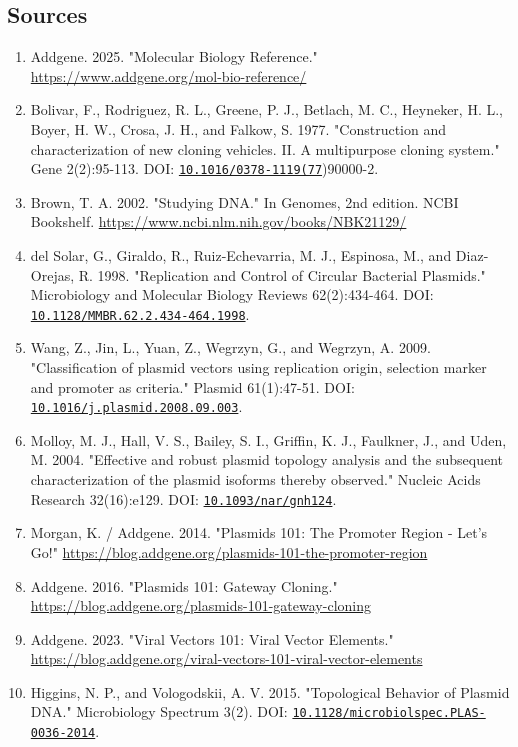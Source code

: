 \documentclass[11pt]{report}
\begin{document}
\subsection{Sources}
\begin{enumerate}
\item Addgene. 2025. "Molecular Biology Reference." \url{https://www.addgene.org/mol-bio-reference/}
\item Bolivar, F., Rodriguez, R. L., Greene, P. J., Betlach, M. C., Heyneker, H. L., Boyer, H. W., Crosa, J. H., and Falkow, S. 1977. "Construction and characterization of new cloning vehicles. II. A multipurpose cloning system." Gene 2(2):95-113. DOI: \href{https://doi.org/10.1016/0378-1119(77}{\nolinkurl{10.1016/0378-1119(77}})90000-2.
\item Brown, T. A. 2002. "Studying DNA." In Genomes, 2nd edition. NCBI Bookshelf. \url{https://www.ncbi.nlm.nih.gov/books/NBK21129/}
\item del Solar, G., Giraldo, R., Ruiz-Echevarria, M. J., Espinosa, M., and Diaz-Orejas, R. 1998. "Replication and Control of Circular Bacterial Plasmids." Microbiology and Molecular Biology Reviews 62(2):434-464. DOI: \href{https://doi.org/10.1128/MMBR.62.2.434-464.1998}{\nolinkurl{10.1128/MMBR.62.2.434-464.1998}}.
\item Wang, Z., Jin, L., Yuan, Z., Wegrzyn, G., and Wegrzyn, A. 2009. "Classification of plasmid vectors using replication origin, selection marker and promoter as criteria." Plasmid 61(1):47-51. DOI: \href{https://doi.org/10.1016/j.plasmid.2008.09.003}{\nolinkurl{10.1016/j.plasmid.2008.09.003}}.
\item Molloy, M. J., Hall, V. S., Bailey, S. I., Griffin, K. J., Faulkner, J., and Uden, M. 2004. "Effective and robust plasmid topology analysis and the subsequent characterization of the plasmid isoforms thereby observed." Nucleic Acids Research 32(16):e129. DOI: \href{https://doi.org/10.1093/nar/gnh124}{\nolinkurl{10.1093/nar/gnh124}}.
\item Morgan, K. / Addgene. 2014. "Plasmids 101: The Promoter Region - Let's Go!" \url{https://blog.addgene.org/plasmids-101-the-promoter-region}
\item Addgene. 2016. "Plasmids 101: Gateway Cloning." \url{https://blog.addgene.org/plasmids-101-gateway-cloning}
\item Addgene. 2023. "Viral Vectors 101: Viral Vector Elements." \url{https://blog.addgene.org/viral-vectors-101-viral-vector-elements}
\item Higgins, N. P., and Vologodskii, A. V. 2015. "Topological Behavior of Plasmid DNA." Microbiology Spectrum 3(2). DOI: \href{https://doi.org/10.1128/microbiolspec.PLAS-0036-2014}{\nolinkurl{10.1128/microbiolspec.PLAS-0036-2014}}.
\end{enumerate}
\end{document}
